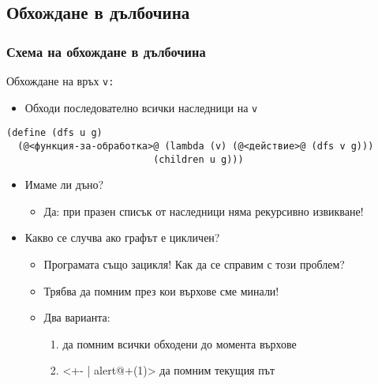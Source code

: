 \documentclass[alsotrans]{beamerswitch}
\begin{document}
\subsection{Обхождане в дълбочина}

\begin{frame}[fragile]
  \frametitle{Схема на обхождане в дълбочина}

  Обхождане на връх \tt v:
  \begin{itemize}
  \item Обходи последователно всички наследници на \tt v
  \end{itemize}
  \pause
{\small
\begin{lstlisting}
(define (dfs u g)
  (@<функция-за-обработка>@ (lambda (v) (@<действие>@ (dfs v g)))
                          (children u g)))
\end{lstlisting}
}
  \pause
  \begin{itemize}[<+->]
  \item \alert{Имаме ли дъно?}
    \begin{itemize}
    \item Да:  при празен списък от наследници няма рекурсивно извикване!
    \end{itemize}
  \item \alert{Какво се случва ако графът е цикличен?}
    \begin{itemize}
    \item Програмата също зацикля! Как да се справим с този проблем?
    \item Трябва да помним през кои върхове сме минали!
    \item Два варианта:
      \begin{enumerate}
      \item да помним всички обходени до момента върхове
      \item<+- | alert@+(1)> да помним текущия път
      \end{enumerate}
    \end{itemize}
  \end{itemize}
\end{frame}
\end{document}

